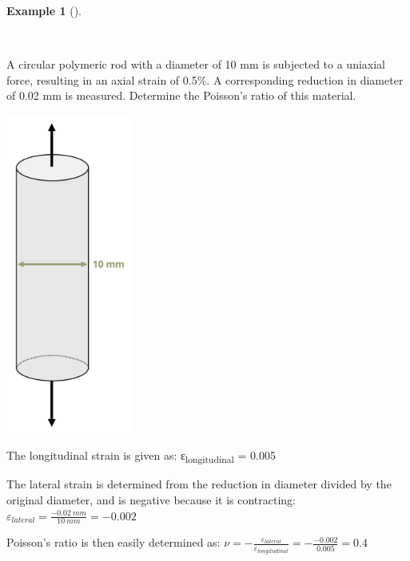\documentclass[
  letterpaper,
  DIV=11,
  numbers=noendperiod]{scrreprt}
\theoremstyle{definition}
\newtheorem{example}{Example}[chapter]
\theoremstyle{remark}
\begin{document}
\begin{tcolorbox}[enhanced jigsaw, leftrule=.75mm, bottomrule=.15mm, opacityback=0, opacitybacktitle=0.6, colframe=quarto-callout-tip-color-frame, toprule=.15mm, colbacktitle=quarto-callout-tip-color!10!white, coltitle=black, bottomtitle=1mm, title={Example 4.2}, titlerule=0mm, toptitle=1mm, colback=white, rightrule=.15mm, left=2mm, arc=.35mm, breakable]

\begin{example}[]\protect\hypertarget{exm-4.2}{}\label{exm-4.2}

~

A circular polymeric rod with a diameter of 10 mm is subjected to a
uniaxial force, resulting in an axial strain of 0.5\%. A corresponding
reduction in diameter of 0.02 mm is measured. Determine the Poisson's
ratio of this material.

\begin{center}
\includegraphics[width=1.61458in,height=\textheight]{images/Chapter 4 edits v2/example 4.2 v2.png}
\end{center}

\begin{tcolorbox}[enhanced jigsaw, leftrule=.75mm, bottomrule=.15mm, opacityback=0, opacitybacktitle=0.6, colframe=quarto-callout-tip-color-frame, toprule=.15mm, colbacktitle=quarto-callout-tip-color!10!white, coltitle=black, bottomtitle=1mm, title={Solution}, titlerule=0mm, toptitle=1mm, colback=white, rightrule=.15mm, left=2mm, arc=.35mm, breakable]

The longitudinal strain is given as: ε\textsubscript{longitudinal} =
0.005

The lateral strain is determined from the reduction in diameter divided
by the original diameter, and is negative because it is contracting:
\(\varepsilon_{lateral}=\frac{-0.02{~mm}}{10{~mm}}=-0.002\)

Poisson's ratio is then easily determined as:
\(\nu=-\frac{\varepsilon_{lateral}}{\varepsilon_{longitudinal}}=-\frac{-0.002}{0.005}=0.4\)

\end{tcolorbox}

\end{example}

\end{tcolorbox}
\end{document}
